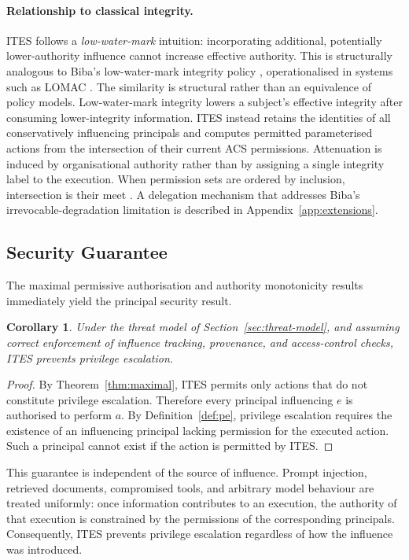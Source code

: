\documentclass{article}
\newtheorem{corollary}{Corollary}
\begin{document}
\paragraph{Relationship to classical integrity.}
ITES follows a \emph{low-water-mark} intuition: incorporating additional,
potentially lower-authority influence cannot increase effective authority. This
is structurally analogous to Biba's low-water-mark integrity policy
\citep{biba1977}, operationalised in systems such as LOMAC
\citep{lomac2001}. The similarity is structural rather than an equivalence of
policy models. Low-water-mark integrity lowers a subject's effective integrity
after consuming lower-integrity information. ITES instead retains the
identities of all conservatively influencing principals and computes permitted
parameterised actions from the intersection of their current ACS permissions.
Attenuation is induced by organisational authority rather than by assigning a
single integrity label to the execution. When permission sets are ordered by
inclusion, intersection is their meet \citep{denning1976}. A delegation
mechanism that addresses Biba's irrevocable-degradation limitation is
described in Appendix~\ref{app:extensions}.

\subsection{Security Guarantee}

The maximal permissive authorisation and authority monotonicity results
immediately yield the principal security result.

\begin{corollary}
\label{cor:pe-prevention}
Under the threat model of Section~\ref{sec:threat-model}, and assuming correct
enforcement of influence tracking, provenance, and access-control checks,
ITES prevents privilege escalation.
\end{corollary}

\begin{proof}
By Theorem~\ref{thm:maximal}, ITES permits only actions that do not constitute
privilege escalation. Therefore every principal influencing $e$ is authorised
to perform $a$. By Definition~\ref{def:pe}, privilege escalation requires the
existence of an influencing principal lacking permission for the executed
action. Such a principal cannot exist if the action is permitted by ITES.
\end{proof}

This guarantee is independent of the source of influence. Prompt injection,
retrieved documents, compromised tools, and arbitrary model behaviour are
treated uniformly: once information contributes to an execution, the authority
of that execution is constrained by the permissions of the corresponding
principals. Consequently, ITES prevents privilege escalation regardless of how
the influence was introduced.
\end{document}
